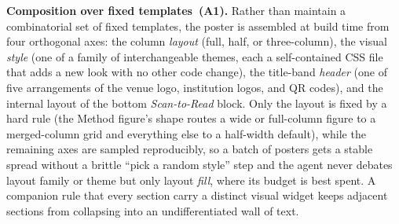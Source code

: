 \documentclass{article}
\begin{document}
\textbf{Composition over fixed templates~(A1).} Rather than maintain a combinatorial set of fixed templates, the poster is assembled at build time from four orthogonal axes: the column \emph{layout} (full, half, or three-column), the visual \emph{style} (one of a family of interchangeable themes, each a self-contained CSS file that adds a new look with no other code change), the title-band \emph{header} (one of five arrangements of the venue logo, institution logos, and QR codes), and the internal layout of the bottom \emph{Scan-to-Read} block. Only the layout is fixed by a hard rule (the Method figure's shape routes a wide or full-column figure to a merged-column grid and everything else to a half-width default), while the remaining axes are sampled reproducibly, so a batch of posters gets a stable spread without a brittle ``pick a random style'' step and the agent never debates layout family or theme but only layout \emph{fill}, where its budget is best spent. A companion rule that every section carry a distinct visual widget keeps adjacent sections from collapsing into an undifferentiated wall of text.
\end{document}
